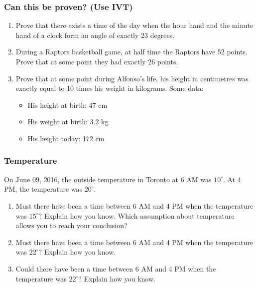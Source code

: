 \documentclass[14pt]{beamer}
\begin{document}
\begin{frame}[t]
	\frametitle{Can this be proven? (Use IVT)}
	\fontsize{13}{13}\selectfont
	\begin{enumerate}
		\item Prove that there exists a time of the day when the hour hand and the minute
			hand of a clock form an angle of exactly 23 degrees.

			\vfill

		\item During a Raptors basketball game, at half time the Raptors have 52
			points. Prove that at some point they had exactly 26 points.

			\vfill

		\item Prove that at some point during Alfonso's life, his height in
			centimetres was exactly equal to 10 times his weight in kilograms. Some data:
			\begin{itemize}
				\item His height at birth: 47 cm

				\item His weight at birth: 3.2 kg

				\item His height today: 172 cm
			\end{itemize}
			\vfill
	\end{enumerate}
\end{frame}

\begin{frame}
	\frametitle{Temperature}

	On June 09, 2016, the outside temperature in Toronto at 6 AM was $10^{\circ}$.
	At 4 PM, the temperature was $20^{\circ}$.

	\begin{enumerate}
		\item Must there have been a time between 6 AM and 4 PM when the temperature
			was $15^{\circ}$? Explain how you know. Which assumption about temperature
			allows you to reach your conclusion?

		\item Must there have been a time between 6 AM and 4 PM when the temperature
			was $22^{\circ}$? Explain how you know.

		\item Could there have been a time between 6 AM and 4 PM when the temperature
			was $22^{\circ}$? Explain how you know.
	\end{enumerate}
\end{frame}
\end{document}

